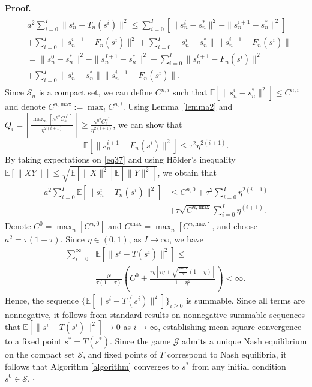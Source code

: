 \documentclass[twocolumn]{autart}
\newenvironment{proof}[1][Proof]{%
  \par\noindent\textbf{#1.}\ }{%
  \hfill$\square$\par
}
\begin{document}
\begin{proof}
\begin{equation}
\begin{aligned}
\begin{split}
			&a^2\sum_{i=0}^{I}{\|s_n^i-T_n(s^i)\|^2}\leq \sum_{i=0}^{I}{\left[\|s_n^i-s_n^*\|^2-\|s_n^{i+1}-s_n^*\|^2\right]}\\
			&+\sum_{i=0}^{I}{\|s_n^{i+1}-F_n(s^i)\|^2}+\sum_{i=0}^{I}{\|s_n^i-s_n^*\|\|s_n^{i+1}-F_n(s^i)\|}\\
            &=\|s_n^0-s_n^*\|^2-\|s_n^{I+1}-s_n^*\|^2
			+\sum_{i=0}^{I}{\|s_n^{i+1}-F_n(s^i)\|^2}\\&+\sum_{i=0}^{I}{\|s_n^i-s_n^*\|\|s_n^{i+1}-F_n(s^i)\|}.
			\end{split}
		\end{aligned}
	\end{equation}
	Since $\mathcal{S}_n$ is a compact set, we can define $C^{n,i}$ such that $\mathbb{E}[\|s_n^i-s_n^*\|^2]\leq C^{n,i}$ and denote $C^{n,\text{max}}:=\max_i{C^{n,i}}$. Using Lemma~\ref{lemma2} and  $Q_i=\left\lceil\frac{\max_{n}{[\kappa^{n^2}C_b^{n^2}]}}{\eta^{2(i+1)}}\right\rceil\geq \frac{\kappa^{n^2}C_b^{n^2}}{\eta^{2(i+1)}}$, we can show that \[\mathbb{E}[\|s_n^{i+1}-F_n(s^i)\|^2]\leq \tau^2\eta^{2(i+1)}.\] By taking expectations on \eqref{eq37} and using H{\"o}lder's inequality $\mathbb{E}[\|XY\|]\leq\sqrt{\mathbb{E}[\|X\|^2]\mathbb{E}[\|Y\|^2]}$, we obtain that 
 \begin{equation*}
 \begin{aligned}
     \begin{split}
         a^2\sum_{i=0}^{I}{\mathbb{E}[\|s_n^i-T_n(s^i)\|^2]}&\leq C^{n,0}+\tau^2\sum_{i=0}^{I}{\eta^{2(i+1)}}\\&+\tau\sqrt{C^{n,\text{max}}}\sum_{i=0}^{I}{\eta^{(i+1)}}.
     \end{split}
 \end{aligned}
 \end{equation*}
 Denote $C^0=\max_n{[C^{n,0}]}$ and $C^{\text{max}}=\max_n{[C^{n,\text{max}}]}$, and choose $a^2=\tau(1-\tau)$. Since $\eta\in (0,1)$, as $I\to\infty$, we have
    \begin{equation*}
        \begin{aligned}
           \sum_{i=0}^{\infty}&{\mathbb{E}[\|s^i-T(s^i)\|^2]}\leq\\ &\frac{N}{\tau(1-\tau)}\left(C^0+\frac{\tau\eta[\tau\eta+\sqrt{\frac{C^{\text{max}}}{N}}(1+\eta)]}{1-\eta^2}\right)<\infty.
        \end{aligned}
    \end{equation*}
    Hence, the sequence $\{\mathbb{E}[\|s^i-T(s^i)\|^2]\}_{i\ge0}$ is summable. Since all terms are nonnegative, it follows from standard results on nonnegative summable sequences \cite[Theorem 3.24]{rudin2021principles} that
$
\mathbb{E}[\|s^i-T(s^i)\|^2] \to 0
$ as $i\to\infty$,
establishing mean-square convergence to a fixed point $s^*=T(s^*)$.  Since the game $\mathcal{G}$ admits a unique Nash equilibrium on the compact set $\mathcal{S}$, and fixed points of $T$ correspond to Nash equilibria, it follows that Algorithm \ref{algorithm} converges to $s^*$ from any initial condition $s^0 \in \mathcal{S}$.
\end{proof}
\end{document}
